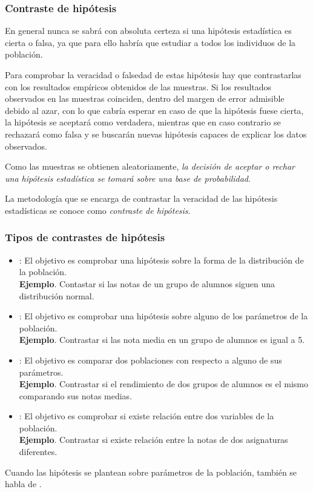 \begin{frame}
\frametitle{Contraste de hipótesis}
En general nunca se sabrá con absoluta certeza si una hipótesis estadística es cierta o falsa, ya que para ello habría
que estudiar a todos los individuos de la población. 

Para comprobar la veracidad o falsedad de estas hipótesis hay que contrastarlas con los resultados empíricos obtenidos
de las muestras. 
Si los resultados observados en las muestras coinciden, dentro del margen de error admisible debido al azar, con lo que cabría
esperar en caso de que la hipótesis fuese cierta, la hipótesis se aceptará como verdadera, mientras que en caso
contrario se rechazará como falsa y se buscarán nuevas hipótesis capaces de explicar los datos observados.

Como las muestras se obtienen aleatoriamente, \alert{\emph{la decisión de aceptar o rechar una hipótesis estadística se
tomará sobre una base de probabilidad}}.

La metodología que se encarga de contrastar la veracidad de las hipótesis estadísticas se conoce como \emph{contraste
de hipótesis}.
\end{frame}


\begin{frame}
\frametitle{Tipos de contrastes de hipótesis}
\begin{itemize}
\item {}: El objetivo es comprobar una hipótesis sobre la forma de la
distribución de la población.\\
\textbf{Ejemplo}. Contastar si las notas de un grupo de alumnos siguen una distribución normal.
\item {}: El objetivo es comprobar una hipótesis sobre alguno de los parámetros
de la población.\\
\textbf{Ejemplo}. Contrastar si las nota media en un grupo de alumnos es igual a 5.
\item {}: El objetivo es comparar dos poblaciones con respecto a alguno de sus
parámetros.\\
\textbf{Ejemplo}. Contrastar si el rendimiento de dos grupos de alumnos es el mismo comparando sus notas medias. 
\item {}: El objetivo es comprobar si existe relación entre dos
variables de la población.\\
\textbf{Ejemplo}. Contrastar si existe relación entre la notas de dos asignaturas diferentes.  
\end{itemize}
Cuando las hipótesis se plantean sobre parámetros de la población, también se habla de .
\end{frame}


